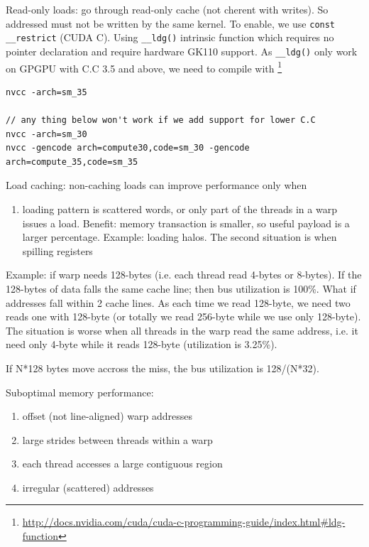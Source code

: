 Read-only loads: go through read-only cache (not cherent with writes). So
addressed must not be written by the same kernel. To enable, we use 
\verb!const __restrict! (CUDA C). Using \verb!__ldg()! intrinsic function which
requires no pointer declaration and require hardware GK110 support. As
\verb!__ldg()! only work on GPGPU with C.C 3.5 and above, we need to compile
with
\footnote{\url{http://docs.nvidia.com/cuda/cuda-c-programming-guide/index.html\#ldg-function}}
\begin{verbatim}
nvcc -arch=sm_35 

// any thing below won't work if we add support for lower C.C
nvcc -arch=sm_30
nvcc -gencode arch=compute30,code=sm_30 -gencode arch=compute_35,code=sm_35
\end{verbatim}


Load caching: non-caching loads can improve performance only when 
\begin{enumerate}
  \item loading pattern is scattered words, or only part of the threads in a
  warp issues a load. Benefit: memory transaction is smaller, so useful payload
  is a larger percentage. Example: loading halos. The second situation is when
  spilling registers
\end{enumerate}
Example: if warp needs 128-bytes (i.e. each thread read 4-bytes or 8-bytes).
If the 128-bytes of data falls the same cache line; then bus utilization is
100\%. What if addresses fall within 2 cache lines. As each time we read
128-byte, we need two reads one with 128-byte (or totally we read 256-byte
while we use only 128-byte). The situation is worse when all threads in the warp
read the same address, i.e. it need only 4-byte while it reads 128-byte
(utilization is 3.25\%). 

If N*128 bytes move accross the miss, the bus utilization is 128/(N*32). 

Suboptimal memory performance:
\begin{enumerate}
  \item offset (not line-aligned) warp addresses
  \item large strides between threads within a warp
  \item each thread accesses a large contiguous region
  \item irregular (scattered) addresses 
\end{enumerate}

